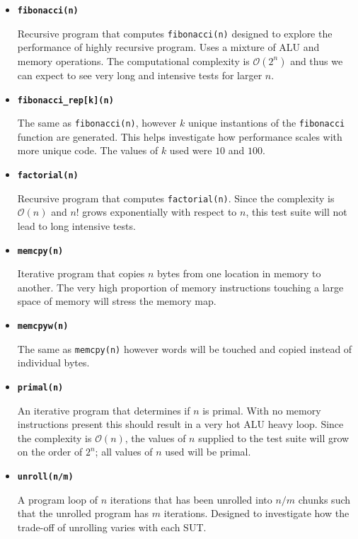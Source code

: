 \begin{itemize}
    \item \textbf{\texttt{fibonacci(n)}}
    
    Recursive program that computes \texttt{fibonacci(n)} designed to explore the performance of highly recursive program. Uses a mixture of ALU and memory operations. The computational complexity is $\mathcal{O}(2^n)$ and thus we can expect to see very long and intensive tests for larger $n$.
    
    \item \textbf{\texttt{fibonacci\_rep[k](n)}}
    
    The same as \texttt{fibonacci(n)}, however $k$ unique instantions of the \texttt{fibonacci} function are generated. This helps investigate how performance scales with more unique code. The values of $k$ used were $10$ and $100$.
    
    \item \textbf{\texttt{factorial(n)}}
    
    Recursive program that computes \texttt{factorial(n)}. Since the complexity is $\mathcal{O}(n)$ and $n!$ grows exponentially with respect to $n$, this test suite will not lead to long intensive tests.

    \item \textbf{\texttt{memcpy(n)}}
    
    Iterative program that copies $n$ bytes from one location in memory to another. The very high proportion of memory instructions touching a large space of memory will stress the memory map.
    
    \item \textbf{\texttt{memcpyw(n)}}
    
    The same as \texttt{memcpy(n)} however words will be touched and copied instead of individual bytes.
    
    \item \textbf{\texttt{primal(n)}}
    
    An iterative program that determines if $n$ is primal. With no memory instructions present this should result in a very hot ALU heavy loop. Since the complexity is $\mathcal{O}(n)$, the values of $n$ supplied to the test suite will grow on the order of $2^n$; all values of $n$ used will be primal.
    
    \item \textbf{\texttt{unroll(n/m)}}
    
    A program loop of $n$ iterations that has been unrolled into $n/m$ chunks such that the unrolled program has $m$ iterations. Designed to investigate how the trade-off of unrolling varies with each SUT.
\end{itemize}

